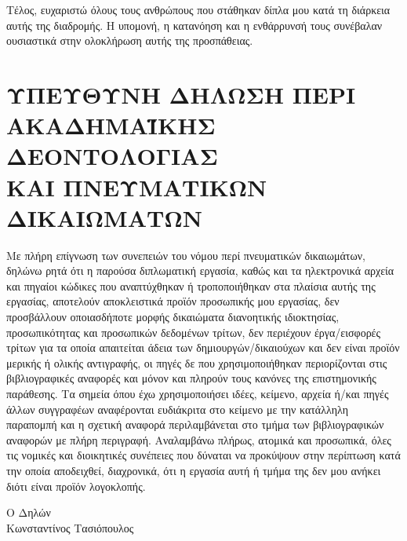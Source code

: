 \documentclass[12pt,a4paper,twoside,fleqn]{book}
\newcommand{\AuthorGreek}{Κωνσταντίνος Τασιόπουλος}
\newcommand{\blankpage}{%
  \clearpage
  \thispagestyle{empty}
  \null
  \clearpage
}
\begin{document}
Τέλος, ευχαριστώ όλους τους ανθρώπους που στάθηκαν δίπλα μου κατά τη διάρκεια
αυτής της διαδρομής. Η υπομονή, η κατανόηση και η ενθάρρυνσή τους συνέβαλαν
ουσιαστικά στην ολοκλήρωση αυτής της προσπάθειας.

\blankpage

\chapter*{\Large ΥΠΕΥΘΥΝΗ ΔΗΛΩΣΗ ΠΕΡΙ ΑΚΑΔΗΜΑΪΚΗΣ ΔΕΟΝΤΟΛΟΓΙΑΣ\\ΚΑΙ ΠΝΕΥΜΑΤΙΚΩΝ ΔΙΚΑΙΩΜΑΤΩΝ}

Με πλήρη επίγνωση των συνεπειών του νόμου περί πνευματικών δικαιωμάτων, δηλώνω ρητά ότι η παρούσα διπλωματική εργασία, καθώς και τα ηλεκτρονικά αρχεία και πηγαίοι κώδικες που αναπτύχθηκαν ή τροποποιήθηκαν στα πλαίσια αυτής της εργασίας, αποτελούν αποκλειστικά προϊόν προσωπικής μου εργασίας, δεν προσβάλλουν οποιασδήποτε μορφής δικαιώματα διανοητικής ιδιοκτησίας, προσωπικότητας και προσωπικών δεδομένων τρίτων, δεν περιέχουν έργα/εισφορές τρίτων για τα οποία απαιτείται άδεια των δημιουργών/δικαιούχων και δεν είναι προϊόν μερικής ή ολικής αντιγραφής, οι πηγές δε που χρησιμοποιήθηκαν περιορίζονται στις βιβλιογραφικές αναφορές και μόνον και πληρούν τους κανόνες της επιστημονικής παράθεσης. Τα σημεία όπου έχω χρησιμοποιήσει ιδέες, κείμενο, αρχεία ή/και πηγές άλλων συγγραφέων αναφέρονται ευδιάκριτα στο κείμενο με την κατάλληλη παραπομπή και η σχετική αναφορά περιλαμβάνεται στο τμήμα των βιβλιογραφικών αναφορών με πλήρη περιγραφή. Αναλαμβάνω πλήρως, ατομικά και προσωπικά, όλες τις νομικές και διοικητικές συνέπειες που δύναται να προκύψουν στην περίπτωση κατά την οποία αποδειχθεί, διαχρονικά, ότι η εργασία αυτή ή τμήμα της δεν μου ανήκει διότι είναι προϊόν λογοκλοπής.

\vspace{1cm}
\noindent Ο Δηλών\\
\AuthorGreek

\clearpage

\end{document}
